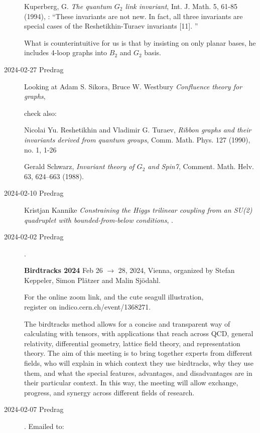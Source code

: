 \begin{description}
Kuperberg, G. {\em The quantum $G_2$ link invariant}, Int. J. Math. 5, 61-85 (1994),
:
``These invariants are not new. In fact, all three invariants are special
cases of the Reshetikhin-Turaev invariants [11]. ''

What is counterintuitive for us is that by insisting on only planar bases, he includes
4-loop graphs into  $B_2$ and $G_2$ basis.

\item[2024-02-27 Predrag]
Looking at
Adam S. Sikora, Bruce W. Westbury
{\em Confluence theory for graphs}, 

check also:

Nicolai Yu. Reshetikhin and Vladimir G. Turaev,
{\em Ribbon graphs and their invariants derived from
quantum groups}, Comm. Math. Phys. 127 (1990), no. 1, 1-26

Gerald Schwarz,
{\em Invariant theory of $G_2$ and Spin7},
Comment. Math. Helv. 63, 624--663  (1988).

\item[2024-02-10 Predrag]
Kristjan Kannike
{\em Constraining the Higgs trilinear coupling from an SU(2) quadruplet
with bounded-from-below conditions},
.

\item[2024-02-02 Predrag].

\textbf{Birdtracks 2024}
Feb 26  $\to$ 28, 2024, Vienna,
organized by Stefan Keppeler, Simon Pl{\"a}tzer and Malin Sj{\"o}dahl.

For the online zoom link, and the cute seagull illustration,
\\ register on
{indico.cern.ch/event/1368271}.

The birdtracks method allows for a concise and transparent way of
calculating with tensors, with applications that reach across QCD,
general relativity, differential geometry, lattice field theory, and
representation theory. The aim of this meeting is to bring together
experts from different fields, who will explain in which context they use
birdtracks, why they use them, and what the special features, advantages,
and disadvantages are in their particular context. In this way, the
meeting will allow exchange, progress, and synergy across different
fields of research.

\item[2024-02-07 Predrag].
Emailed to:\\


\end{description}
